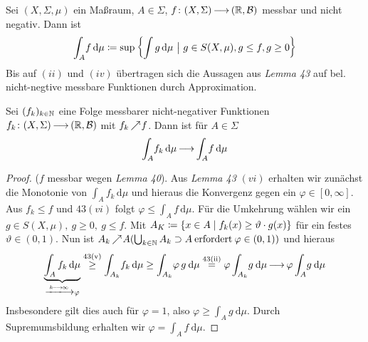 \documentclass[skript.tex]{subfiles}
\begin{document}
	\begin{defin}[Integral]
		Sei $(X,\Sigma,\mu)$ ein Maßraum, $A\in\Sigma$, $f\colon(X,\Sigma)\kern -1pt \longrightarrow \kern -1pt(\mathbb{R},\mathcal{B})$ messbar und nicht negativ. Dann ist
	\begin{equation*}
		\int_{A} \! f \, \mathrm{d}\mu\coloneqq \sup \left\{\int g \, \mathrm{d}\mu\ \big|\ g\in S(X,\mu),g \le f, g\geq 0\right\}
	\end{equation*}
	Bis auf $(ii)$ und $(iv)$ übertragen sich die Aussagen aus \textit{Lemma 43} auf bel. nicht-negtive messbare Funktionen durch Approximation.
	\end{defin}

	\begin{theorem}
		Sei $(f_k)_{k\in\mathbb{N}}$ eine Folge messbarer nicht-negativer Funktionen $f_k\colon(X,\Sigma)\kern -1pt \longrightarrow \kern -1pt(\mathbb{R},\mathcal{B})$ mit $f_k \kern -1pt \nearrow \kern -2pt f$. Dann ist für $A\in\Sigma$
		\begin{equation*}
			\int_{A} \! f_k \, \mathrm{d}\mu \kern -1pt \longrightarrow \kern -1pt \int_{A} \! f \, \mathrm{d}\mu
		\end{equation*}
	\end{theorem}

	\begin{proof}
		($f$ messbar wegen \textit{Lemma 40}). Aus \textit{Lemma 43} $(vi)$ erhalten wir zunächst die Monotonie von $\int_{A} \! f_k \, \mathrm{d}\mu$ und hieraus die Konvergenz gegen ein $\varphi \in [0,\infty]$. Aus $f_k\leq f$ und $43(vi)$ folgt $\varphi\leq\int_{A} \! f \, \mathrm{d}\mu$. Für die Umkehrung wählen wir ein $g\in S(X,\mu), \: g\geq0, \: g\leq f$. Mit $A_K \coloneqq \{x\in A\mid f_k(x)\geq \vartheta \cdot g(x)\}$ für ein festes $\vartheta\in (0,1)$. Nun ist $A_k \kern -1pt \nearrow \kern -2pt A \\(\bigcup_{k\in\mathbb{N}}A_k \supset A \: \mathrm{erfordert} \: \varphi\in(0,1)) $ und hieraus
		\begin{equation*}
			\underbrace{\int_A f_k \, \mathrm{d}\mu}_{\xlongrightarrow{k\lra\infty}\varphi} \stackrel{\text{43(v)}}{\geq}\int_{A_k} \! f_k \,\mathrm{d}\mu\geq\int_{A_k} \! \varphi \, g \: \mathrm{d}\mu\stackrel{\text{43(ii)}}{=}\varphi\int_{A_k} \! g \: \mathrm{d}\mu \lra \varphi\int_A \! g \: \mathrm{d}\mu
		\end{equation*}
		Insbesondere gilt dies auch für $\varphi=1$, also $\varphi\geq\int_A \! g \: \mathrm{d}\mu$. Durch Supremumsbildung erhalten wir $\varphi=\int_A \! f \: \mathrm{d}\mu$.
	\end{proof}
\end{document}
